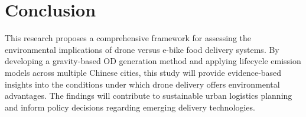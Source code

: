 \documentclass[11pt]{article}
\begin{document}



\section{Conclusion}

This research proposes a comprehensive framework for assessing the environmental implications of drone versus e-bike food delivery systems. By developing a gravity-based OD generation method and applying lifecycle emission models across multiple Chinese cities, this study will provide evidence-based insights into the conditions under which drone delivery offers environmental advantages. The findings will contribute to sustainable urban logistics planning and inform policy decisions regarding emerging delivery technologies.

\printbibliography
\end{document}
